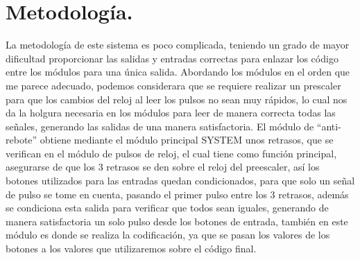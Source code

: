 \documentclass[a4paper, 12pt]{article}
\begin{document}
    
    \section{Metodología.}
    La metodología de este sistema es poco complicada, teniendo un grado de mayor dificultad proporcionar las salidas y entradas correctas para enlazar los código entre los módulos para una única salida.
    Abordando los módulos en el orden que me parece adecuado, podemos considerara que se requiere realizar un prescaler para que los cambios del reloj al leer los pulsos no sean muy rápidos, lo cual nos da la holgura necesaria en los módulos para leer de manera correcta todas las señales, generando las salidas de una manera satisfactoria. El módulo de “anti-rebote” obtiene mediante el módulo principal SYSTEM unos retrasos, que se verifican en el módulo de pulsos de reloj, el cual tiene como función principal, asegurarse de que los 3 retrasos se den sobre el reloj del preescaler, así los botones utilizados para las entradas quedan condicionados,  para que solo un señal de pulso se tome en cuenta, pasando el primer pulso entre los 3 retrasos, además se condiciona esta salida para verificar que todos sean iguales, generando de manera satisfactoria un solo pulso desde los botones de entrada, también en este módulo es donde se realiza la codificación, ya que se pasan los valores de los botones a los valores que utilizaremos  sobre el código final.
\end{document}
